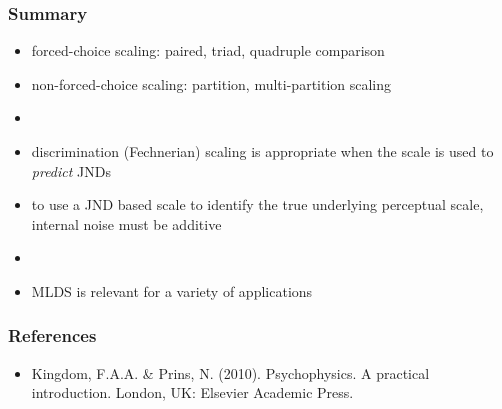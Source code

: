 \documentclass[]{beamer}
\begin{document}
\begin{frame}
 \frametitle{Summary}
\begin{itemize}
 \item forced-choice scaling: paired, triad, quadruple comparison
 \item non-forced-choice scaling: partition, multi-partition scaling
 \item[]  
 \item discrimination (Fechnerian) scaling is appropriate when the scale is used to \textit{predict} JNDs 
 \item to use a JND based scale to identify the true underlying perceptual scale, internal noise must be additive
 \item[]
 \item MLDS is relevant for a variety of applications
\end{itemize}
\end{frame}


\begin{frame}
 \frametitle{References}
\begin{small}
\begin{itemize}
 \item  Kingdom, F.A.A. \& Prins, N. (2010). Psychophysics. A practical introduction. London, UK: Elsevier Academic Press.
\end{itemize}
\end{small}
\end{frame}
\end{document}
